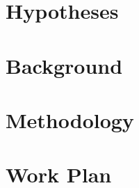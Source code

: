 \documentclass[11pt]{article}
\begin{document}
\section{Hypotheses}


\section{Background}


\section{Methodology}


\section{Work Plan}




\end{document}
